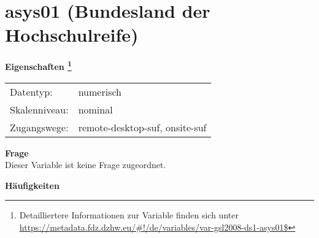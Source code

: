 
    \setcounter{footnote}{0}

    \vspace*{-1.8cm}
	\section{asys01 (Bundesland der Hochschulreife)}
	\label{section:asys01}



    \vspace*{0.5cm}
    \noindent\textbf{Eigenschaften
	\footnote{Detailliertere Informationen zur Variable finden sich unter
		\url{https://metadata.fdz.dzhw.eu/\#!/de/variables/var-gsl2008-ds1-asys01$}}}\\
	\begin{tabularx}{\hsize}{@{}lX}
	Datentyp: & numerisch \\
	Skalenniveau: & nominal \\
	Zugangswege: &
	  remote-desktop-suf, 
	  onsite-suf
 \\
    \end{tabularx}



		\vspace*{0.5cm}
		\noindent\textbf{Frage}\\
		Dieser Variable ist keine Frage zugeordnet.





        		\vspace*{0.5cm}
                \noindent\textbf{Häufigkeiten}

